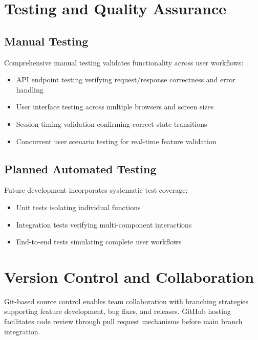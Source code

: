 \documentclass[12pt,a4paper]{report}
\begin{document}
\section{Testing and Quality Assurance}

\subsection{Manual Testing}

Comprehensive manual testing validates functionality across user workflows:

\begin{itemize}[left=0pt]
  \item API endpoint testing verifying request/response correctness and error handling
  \item User interface testing across multiple browsers and screen sizes
  \item Session timing validation confirming correct state transitions
  \item Concurrent user scenario testing for real-time feature validation
\end{itemize}

\subsection{Planned Automated Testing}

Future development incorporates systematic test coverage:

\begin{itemize}[left=0pt]
  \item Unit tests isolating individual functions
  \item Integration tests verifying multi-component interactions
  \item End-to-end tests simulating complete user workflows
\end{itemize}

\section{Version Control and Collaboration}

Git-based source control enables team collaboration with branching strategies supporting feature development, bug fixes, and releases. GitHub hosting facilitates code review through pull request mechanisms before main branch integration.

\cleardoublepage

\end{document}
